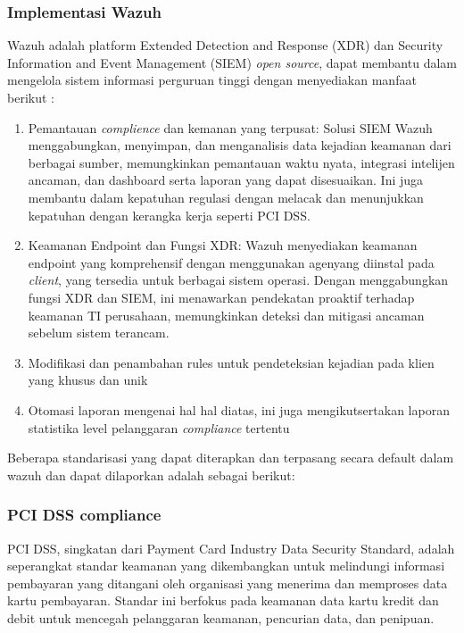 \documentclass[12pt]{article}
\begin{document}
\subsubsection*{Implementasi Wazuh}
Wazuh adalah platform Extended Detection and Response (XDR) dan Security Information and Event Management (SIEM) \emph{open source}, dapat membantu dalam mengelola sistem informasi perguruan tinggi dengan menyediakan manfaat berikut \autocite{Wazuh_2023}:
\begin{enumerate}
    
    \item Pemantauan \emph{complience} dan kemanan yang terpusat: Solusi SIEM Wazuh menggabungkan, menyimpan, dan menganalisis data kejadian keamanan dari berbagai sumber, memungkinkan pemantauan waktu nyata, integrasi intelijen ancaman, dan dashboard serta laporan yang dapat disesuaikan. Ini juga membantu dalam kepatuhan regulasi dengan melacak dan menunjukkan kepatuhan dengan kerangka kerja seperti PCI DSS.

    \item Keamanan Endpoint dan Fungsi XDR: Wazuh menyediakan keamanan endpoint yang komprehensif dengan menggunakan agenyang diinstal pada \emph{client}, yang tersedia untuk berbagai sistem operasi. Dengan menggabungkan fungsi XDR dan SIEM, ini menawarkan pendekatan proaktif terhadap keamanan TI perusahaan, memungkinkan deteksi dan mitigasi ancaman sebelum sistem terancam.
     
    \item Modifikasi dan penambahan rules untuk pendeteksian kejadian pada klien yang khusus dan unik
    
    \item Otomasi laporan mengenai hal hal diatas, ini juga mengikutsertakan laporan statistika level pelanggaran \emph{compliance} tertentu
    
\end{enumerate}

Beberapa standarisasi yang dapat diterapkan dan terpasang secara default dalam wazuh dan dapat dilaporkan adalah sebagai berikut:

\subsubsection*{PCI DSS compliance}
PCI DSS, singkatan dari Payment Card Industry Data Security Standard, adalah seperangkat standar keamanan yang dikembangkan untuk melindungi informasi pembayaran yang ditangani oleh organisasi yang menerima dan memproses data kartu pembayaran. Standar ini berfokus pada keamanan data kartu kredit dan debit untuk mencegah pelanggaran keamanan, pencurian data, dan penipuan.
\end{document}
